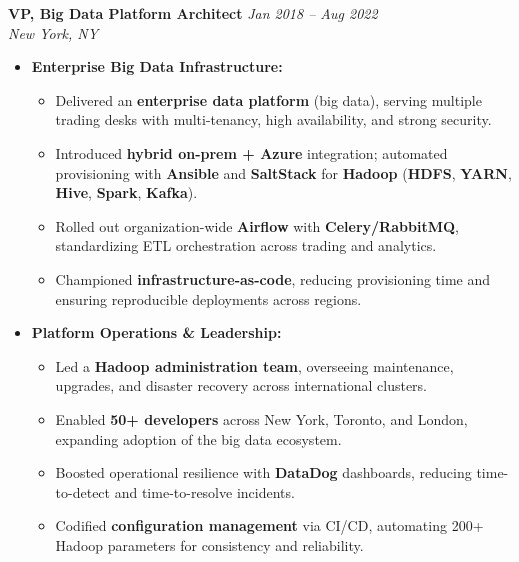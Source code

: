 \vspace{0.15em}
\noindent\textbf{\sffamily VP, Big Data Platform Architect} \hfill \textit{Jan 2018 -- Aug 2022} \\
 \hfill \textit{New York, NY}
\vspace{0.05em}

\begin{itemize}[leftmargin=1.25em, topsep=1pt, partopsep=1.5pt]
\setlength\itemsep{0.22em}

\item \textbf{Enterprise Big Data Infrastructure:}
    \begin{itemize}[leftmargin=2.25em]
        \setlength\itemsep{0.2em}
        \item Delivered an \textbf{enterprise data platform} (big data), serving multiple trading desks with multi-tenancy, high availability, and strong security.
        \item Introduced \textbf{hybrid on-prem + Azure} integration; automated provisioning with \textbf{Ansible} and \textbf{SaltStack} for \textbf{Hadoop} (\textbf{HDFS}, \textbf{YARN}, \textbf{Hive}, \textbf{Spark}, \textbf{Kafka}).
        \item Rolled out organization-wide \textbf{Airflow} with \textbf{Celery/RabbitMQ}, standardizing ETL orchestration across trading and analytics.
        \item Championed \textbf{infrastructure-as-code}, reducing provisioning time and ensuring reproducible deployments across regions.
    \end{itemize}

\item \textbf{Platform Operations \& Leadership:}
    \begin{itemize}[leftmargin=2.25em]
        \setlength\itemsep{0.2em}
        \item Led a \textbf{Hadoop administration team}, overseeing maintenance, upgrades, and disaster recovery across international clusters.
        \item Enabled \textbf{50+ developers} across New York, Toronto, and London, expanding adoption of the big data ecosystem.
        \item Boosted operational resilience with \textbf{DataDog} dashboards, reducing time-to-detect and time-to-resolve incidents.
        \item Codified \textbf{configuration management} via CI/CD, automating 200+ Hadoop parameters for consistency and reliability.
    \end{itemize}

\end{itemize}
